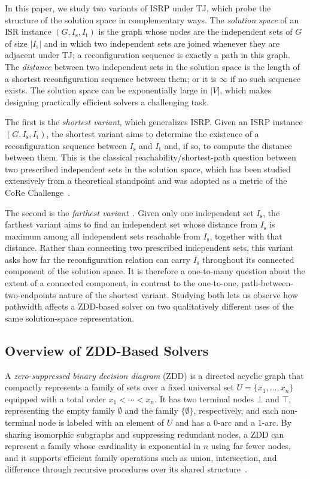 \documentclass[conference]{IEEEtran}
\newcommand{\ini}{\mathrm{s}}
\newcommand{\tar}{\mathrm{t}}
\begin{document}
In this paper, we study two variants of ISRP under TJ, which probe the structure
of the solution space in complementary ways.
The \emph{solution space} of an ISR instance $(G, I_\ini, I_\tar)$ is the graph whose nodes are the
independent sets of $G$ of size $|I_\ini|$ and in which two independent sets are
joined whenever they are adjacent under TJ; a reconfiguration sequence is exactly
a path in this graph. The \emph{distance} between two independent sets in the
solution space is the length of a shortest reconfiguration sequence between them;
or it is $\infty$ if no such sequence exists. The solution space can be exponentially
large in $|V|$, which makes designing practically efficient solvers a challenging
task.

The first is the \emph{shortest variant}, which generalizes ISRP.
Given an ISRP instance $(G, I_\ini, I_\tar)$, the shortest variant aims to
determine the existence of a reconfiguration sequence between $I_\ini$ and
$I_\tar$ and, if so, to compute the distance between them. This is the classical
reachability/shortest-path question between two prescribed independent sets in the solution space,
which has been studied extensively from a theoretical standpoint and was adopted
as a metric of the CoRe Challenge~\cite{sotaokit24}.

The second is the \emph{farthest variant}~\cite{ItoKNSSTT23}.
Given only one independent set $I_\ini$, the farthest variant aims to find an
independent set whose distance from $I_\ini$ is maximum among all independent
sets reachable from $I_\ini$, together with that distance. Rather than connecting
two prescribed independent sets, this variant asks how far the reconfiguration
relation can carry $I_\ini$ throughout its connected component of the solution
space. It is therefore a one-to-many question about the extent of a connected
component, in contrast to the one-to-one, path-between-two-endpoints nature of
the shortest variant. Studying both lets us observe how pathwidth affects a
ZDD-based solver on two qualitatively different uses of the same solution-space
representation.

\subsection{Overview of ZDD-Based Solvers}
\label{subsec:zdd_solver}

A \emph{zero-suppressed binary decision diagram} (ZDD) is a directed acyclic
graph that compactly represents a family of sets over a fixed universal set
$U = \{x_1, \dots, x_n\}$ equipped with a total order $x_1 < \cdots < x_n$.
It has two terminal nodes $\bot$ and $\top$, representing the empty family
$\emptyset$ and the family $\{\emptyset\}$, respectively, and each non-terminal
node is labeled with an element of $U$ and has a $0$-arc and a $1$-arc.
By sharing isomorphic subgraphs and suppressing redundant nodes, a ZDD can
represent a family whose cardinality is exponential in $n$ using far fewer
nodes, and it supports efficient family operations such as union,
intersection, and difference through recursive procedures over its shared
structure~\cite{Minato1993,knuth:taocp41}.
\end{document}

